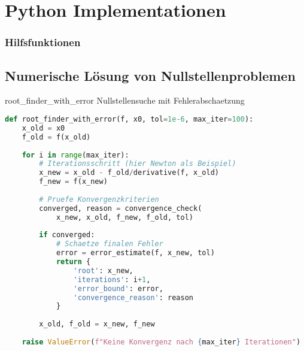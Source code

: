 \section{Python Implementationen}

\subsubsection{Hilfsfunktionen}




\subsection{Numerische Lösung von Nullstellenproblemen}

\begin{examplecode}{root\_finder\_with\_error}
    Nullstellensuche mit Fehlerabschaetzung
\begin{lstlisting}[language=Python, style=basesmol]
def root_finder_with_error(f, x0, tol=1e-6, max_iter=100):
    x_old = x0
    f_old = f(x_old)
    
    for i in range(max_iter):
        # Iterationsschritt (hier Newton als Beispiel)
        x_new = x_old - f_old/derivative(f, x_old)
        f_new = f(x_new)
        
        # Pruefe Konvergenzkriterien
        converged, reason = convergence_check(
            x_new, x_old, f_new, f_old, tol)
            
        if converged:
            # Schaetze finalen Fehler
            error = error_estimate(f, x_new, tol)
            return {
                'root': x_new,
                'iterations': i+1,
                'error_bound': error,
                'convergence_reason': reason
            }
            
        x_old, f_old = x_new, f_new
        
    raise ValueError(f"Keine Konvergenz nach {max_iter} Iterationen")
\end{lstlisting}
\end{examplecode}


